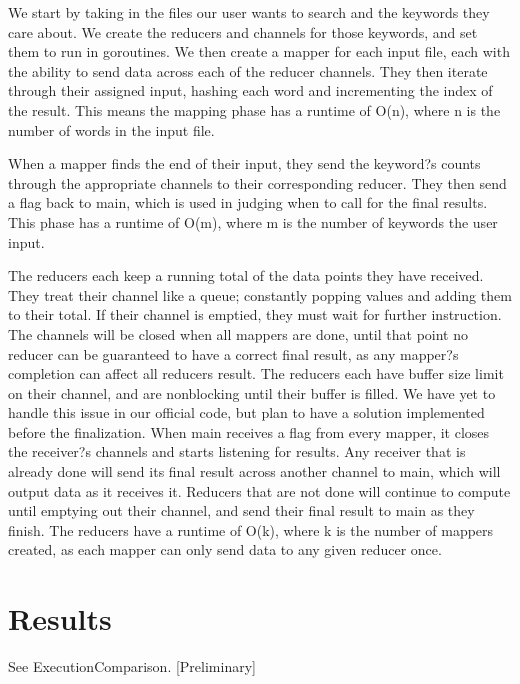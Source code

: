 \documentclass[report]{IEEEtran}
\begin{document}
We start by taking in the files our user wants to search and the keywords they care about. We create the reducers and channels for those keywords, and set them to run in goroutines. We then create a mapper for each input file, each with the ability to send data across each of the reducer channels. They then iterate through their assigned input, hashing each word and incrementing the index of the result. This means the mapping phase has a runtime of O(n), where n is the number of words in the input file.

When a mapper finds the end of their input, they send the keyword?s counts through the appropriate channels to their corresponding reducer. They then send a flag back to main, which is used in judging when to call for the final results. This phase has a runtime of O(m), where m is the number of keywords the user input.

The reducers each keep a running total of the data points they have received. They treat their channel like a queue; constantly popping values and adding them to their total. If their channel is emptied, they must wait for further instruction. The channels will be closed when all mappers are done, until that point no reducer can be guaranteed to have a correct final result, as any mapper?s completion can affect all reducers result. The reducers each have buffer size limit on their channel, and are nonblocking until their buffer is filled. We have yet to handle this issue in our official code, but plan to have a solution implemented before the finalization. When main receives a flag from every mapper, it closes the receiver?s channels and starts listening for results. Any receiver that is already done will send its final result across another channel to main, which will output data as it receives it. Reducers that are not done will continue to compute until emptying out their channel, and send their final result to main as they finish. The reducers have a runtime of O(k), where k is the number of mappers created, as each mapper can only send data to any given reducer once.

\section{Results}
See ExecutionComparison.
[Preliminary]
\end{document}
